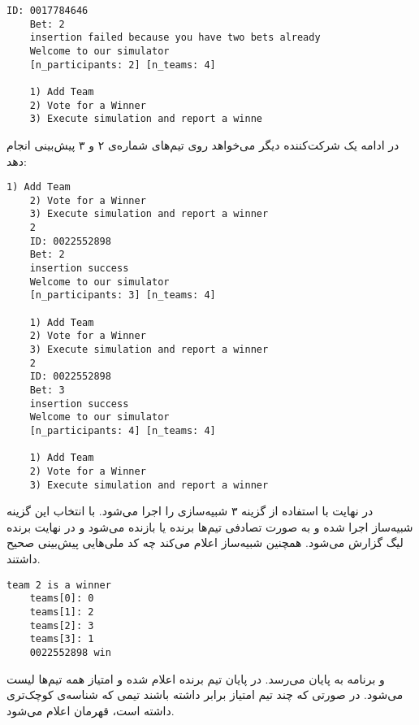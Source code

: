 \documentclass[../main.tex]{subfiles}
\begin{document}
\begin{latin}
\begin{lstlisting}[]
    ID: 0017784646
    Bet: 2
    insertion failed because you have two bets already
    Welcome to our simulator
    [n_participants: 2] [n_teams: 4]

    1) Add Team
    2) Vote for a Winner
    3) Execute simulation and report a winne
\end{lstlisting}
\end{latin}

در ادامه یک شرکت‌کننده دیگر می‌خواهد روی تیم‌های شماره‌ی ۲ و ۳ پیش‌بینی انجام دهد:

\begin{latin}
\begin{lstlisting}[]
    1) Add Team
    2) Vote for a Winner
    3) Execute simulation and report a winner
    2
    ID: 0022552898
    Bet: 2
    insertion success
    Welcome to our simulator
    [n_participants: 3] [n_teams: 4]

    1) Add Team
    2) Vote for a Winner
    3) Execute simulation and report a winner
    2
    ID: 0022552898
    Bet: 3
    insertion success
    Welcome to our simulator
    [n_participants: 4] [n_teams: 4]

    1) Add Team
    2) Vote for a Winner
    3) Execute simulation and report a winner
\end{lstlisting}
\end{latin}

در نهایت با استفاده از گزینه ۳ شبیه‌سازی را اجرا می‌شود.
با انتخاب این گزینه شبیه‌ساز اجرا شده و به صورت تصادفی تیم‌ها برنده یا بازنده می‌شود
و در نهایت برنده لیگ گزارش می‌شود. همچنین شبیه‌ساز اعلام می‌کند چه کد ملی‌هایی پیش‌بینی صحیح داشتند.

\begin{latin}
\begin{lstlisting}[]
    team 2 is a winner
    teams[0]: 0
    teams[1]: 2
    teams[2]: 3
    teams[3]: 1
    0022552898 win
\end{lstlisting}
\end{latin}

و برنامه به پایان می‌رسد. در پایان تیم برنده اعلام شده و امتیاز همه تیم‌ها لیست می‌شود. در صورتی که چند تیم امتیاز برابر داشته باشند
تیمی که شناسه‌ی کوچک‌تری داشته است، قهرمان اعلام می‌شود.

\end{document}
